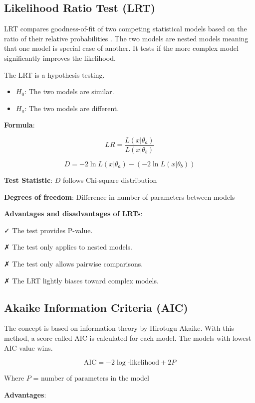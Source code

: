 \documentclass[
]{book}
\providecommand{\tightlist}{%
  \setlength{\itemsep}{0pt}\setlength{\parskip}{0pt}}
\begin{document}
\subsection{Likelihood Ratio Test (LRT)}\label{likelihood-ratio-test-lrt}

LRT compares goodness-of-fit of two competing statistical models based on the ratio of their relative probabilities \citep{gotelli2013}. The two models are nested models meaning that one model is special case of another. It tests if the more complex model significantly improves the likelihood.

The LRT is a hypothesis testing.

\begin{itemize}
\tightlist
\item
  \(H_0\): The two models are similar.
\item
  \(H_a\): The two models are different.
\end{itemize}

\textbf{Formula}:

\[LR = \frac{L(x|\theta_a)}{L(x|\theta_b)}\]

\[D = -2\ln L(x|\theta_a) - (-2\ln L(x|\theta_b))\]

\textbf{Test Statistic}: \(D\) follows Chi-square distribution

\textbf{Degrees of freedom}: Difference in number of parameters between models

\textbf{Advantages and disadvantages of LRTs}:

✓ The test provides P-value.

✗ The test only applies to nested models.

✗ The test only allows pairwise comparisons.

✗ The LRT lightly biases toward complex models.

\subsection{Akaike Information Criteria (AIC)}\label{akaike-information-criteria-aic}

The concept is based on information theory by Hirotugu Akaike. With this method, a score called AIC is calculated for each model. The models with lowest AIC value wins.

\[\text{AIC} = -2 \log\text{-likelihood} + 2P\]

Where \(P\) = number of parameters in the model

\textbf{Advantages}:
\end{document}
